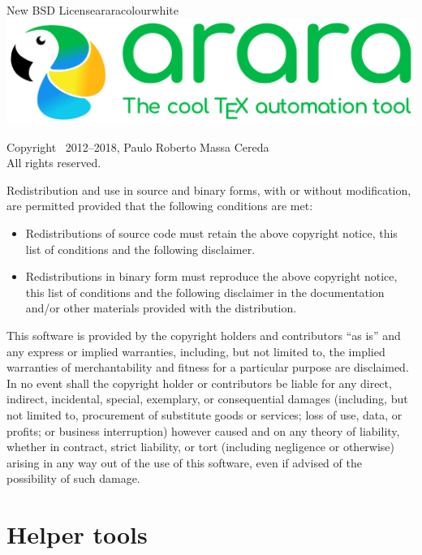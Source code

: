\begin{messagebox}{New BSD License}{araracolour}{\icinfo}{white}
\includegraphics[scale=0.25]{../logos/logo1.pdf}

Copyright \textcopyright\ 2012--2018, Paulo Roberto Massa Cereda\\
All rights reserved.

\vspace{1em}

Redistribution and use in source and binary forms, with or without modification, are permitted provided that the following conditions are met:

\begin{itemize}
\item Redistributions of source code must retain the above copyright notice, this list of conditions and the following disclaimer.

\item Redistributions in binary form must reproduce the above copyright notice, this list of conditions and the following disclaimer in the documentation and/or other materials provided with the distribution.
\end{itemize}

This software is provided by the copyright holders and contributors ``as is'' and any express or implied warranties, including, but not limited to, the implied warranties of merchantability and fitness for a particular purpose are disclaimed. In no event shall the copyright holder or contributors be liable for any direct, indirect, incidental, special, exemplary, or consequential damages (including, but not limited to, procurement of substitute goods or services; loss of use, data, or profits; or business interruption) however caused and on any theory of liability, whether in contract, strict liability, or tort (including negligence or otherwise) arising in any way out of the use of this software, even if advised of the possibility of such damage.
\end{messagebox}

\section*{Helper tools}
\label{sec:licensehelpertools}

